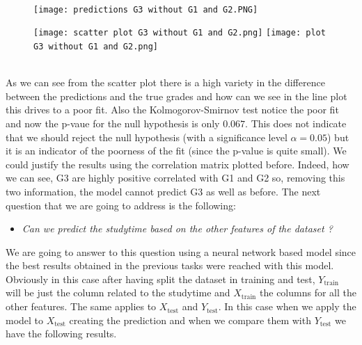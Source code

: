 \documentclass[a4paper, 11pt]{report}
\theoremstyle{definition}
\numberwithin{equation}{section}		%
\numberwithin{table}{section}				%
\begin{document}
\\
\begin{figure}[h]\centering
\texttt{[image: predictions G3 without G1 and G2.PNG]}
\end{figure}
\begin{figure}[h]\centering
\texttt{[image: scatter plot G3 without G1 and G2.png]}
\texttt{[image: plot G3 without G1 and G2.png]}
\end{figure}
\\
As we can see from the scatter plot there is a high variety in the difference between the predictions and the true grades and how can we see in the line plot this drives to a poor fit. Also the Kolmogorov-Smirnov test notice the poor fit and now the p-vaue for the null hypothesis is only $0.067$. This does not indicate that we should reject the null hypothesis (with a significance level $\alpha = 0.05$) but it is an indicator of the poorness of the fit (since the p-value is quite small).
We could justify the results using the correlation matrix plotted before. Indeed, how we can see, G3 are highly positive correlated with G1 and G2 so, removing this two information, the model cannot predict G3 as well as before.
The next question that we are going to address is the following:
\begin{itemize}
    \item \textit{Can we predict the studytime based on the other features of the dataset ?}
\end{itemize}
We are going to answer to this question using a neural network based model since the best results obtained in the previous tasks were reached with this model. Obviously in this case after having split the dataset in training and test, $Y_{\text{train}}$ will be just the column related to the studytime and $X_{\text{train}}$ the columns for all the other features. The same applies to $X_{\text{test}}$ and $Y_{\text{test}}$. In this case when we apply the model to $X_{\text{test}}$ creating the prediction and when we compare them with $Y_{\text{test}}$ we have the following results.\\
\end{document}
